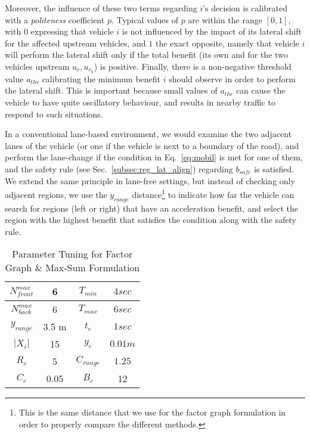 Moreover, the influence of these two terms regarding $i$'s decision is calibrated with a {\em politeness} coefficient $p$.
Typical values of $p$ are within the range $[0,1]$, with $0$ expressing that vehicle $i$ is not influenced by the impact of its lateral shift for the affected upstream vehicles, and $1$ the exact opposite, namely that vehicle $i$ will perform the lateral shift only if the total benefit (its own and for the two vehicles upstream $u_r,u_{r_0}$) is positive.
Finally, there is a non-negative threshold value $a_{thr}$ calibrating the minimum benefit $i$ should observe in order to perform the lateral shift.
This is important because small values of $a_{thr}$ can cause the vehicle to have quite oscillatory behaviour, and results in nearby traffic to respond to such situations.

In a conventional lane-based environment, we would examine the two adjacent lanes of the vehicle (or one if the vehicle is next to a boundary of the road), and perform the lane-change if the condition in Eq.~\ref{eq:mobil} is met for one of them, and the safety rule (see Sec.~\ref{subsec:reg_lat_align}) regarding $b_{safe}$ is satisfied.
We extend the same principle in lane-free settings, but instead of checking only adjacent regions, we use the $y_{range}$ distance\footnote{This is the same distance that we use for the factor graph formulation in order to properly compare the different methods.} to indicate how far the vehicle can search for regions (left or right) that have an acceleration benefit, and select the region with the highest benefit that satisfies the condition along with the safety rule.


\begin{table}[t]
  \centering  
  \caption{Parameter Tuning for Factor Graph \& Max-Sum Formulation}  
  \begin{tabular}{|c|c||c|c|}  
  \hline
     $N^{max}_{front}$ & 6 & $T_{min}$ & $4 sec$\\ 
    \hline
    $N^{max}_{back}$ & 6 & $T_{max}$ & $6 sec$\\ \hline
    $y_{range}$ & 3.5 m & $t_e$  & $1 sec$ \\ \hline
    $|X_i|$ & 15 & $y_e$  & $0.01 m$\\ \hline
    $R_c$ & 5 & $C_{range}$& $1.25$\\ \hline
    $C_c$ & 0.05 &  $B_c$ & 12 \\ \hline    
  \end{tabular}
  \label{tab:fg}  
\end{table}




